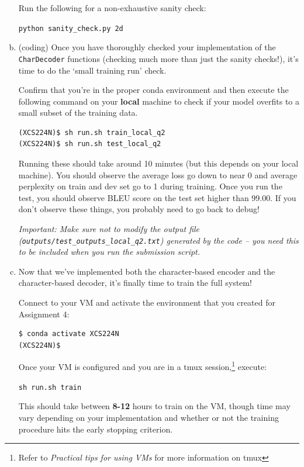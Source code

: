 \begin{enumerate}[(a)]
    Run the following for a non-exhaustive sanity check:
    \begin{center}
        \texttt{python sanity\_check.py 2d}
    \end{center}

    \item {} \label{qn:run_tiny_dec} (coding) Once you have thoroughly checked your implementation of the \texttt{CharDecoder} functions (checking much more than just the sanity checks!), it's time to do the `small training run' check.
    
    Confirm that you're in the proper conda environment and then execute the following command on your \textbf{local} machine to check if your model overfits to a small subset of the training data.
\begin{lstlisting}
(XCS224N)$ sh run.sh train_local_q2
(XCS224N)$ sh run.sh test_local_q2
\end{lstlisting}

    Running these should take around 10 minutes (but this depends on your local machine). 
    You should observe the average loss go down to near 0 and average perplexity on train and dev set go to 1 during training. Once you run the test, you should observe BLEU score on the test set higher than 99.00. 
    If you don't observe these things, you probably need to go back to debug!
    
    \textit{Important: Make sure not to modify the output file (\texttt{outputs/test\_outputs\_local\_q2.txt}) generated by the code -- you need this to be included when you run the submission script.}

    \item {} \label{qn:final_train} Now that we've implemented both the character-based encoder and the character-based decoder, it's finally time to train the full system!

    Connect to your VM and activate the environment that you created for Assignment 4:
\begin{lstlisting}
$ conda activate XCS224N
(XCS224N)$
\end{lstlisting}

    Once your VM is configured and you are in a tmux session,\footnote{Refer to \textit{Practical tips for using VMs} for more information on tmux} execute:
        \begin{center}
            \texttt{sh run.sh train}
        \end{center}
    This should take between \textbf{8-12} hours to train on the VM, though time may vary depending on your implementation and whether or not the training procedure hits the early stopping criterion. 
    

\end{enumerate}
